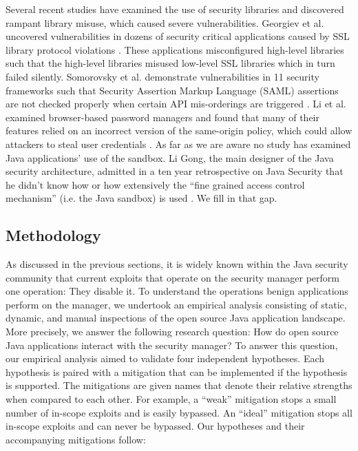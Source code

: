 \documentclass{sig-alternate}
\begin{document}
Several recent studies have examined the use of security libraries
and discovered rampant library misuse, which caused severe vulnerabilities.
Georgiev et al. uncovered vulnerabilities in dozens of security critical
applications caused by SSL library protocol violations \cite{georgiev12most-dangerous}.
These applications misconfigured high-level libraries such that the
high-level libraries misused low-level SSL libraries which in turn
failed silently. Somorovsky et al. demonstrate vulnerabilities in
11 security frameworks such that Security Assertion Markup Language
(SAML) assertions are not checked properly when certain API mis-orderings
are triggered \cite{somorovsky12breaking}. Li et al. examined browser-based
password managers and found that many of their features relied on
an incorrect version of the same-origin policy, which could allow
attackers to steal user credentials \cite{li2014emperor}. As far
as we are aware no study has examined Java applications' use of the
sandbox. Li Gong, the main designer of the Java security architecture,
admitted in a ten year retrospective on Java Security that he didn't
know how or how extensively the ``fine grained access control mechanism''
(i.e. the Java sandbox) is used \cite{gong2009java}. We fill in that
gap. 

\subsection{Methodology}

As discussed in the previous sections, it is widely known within the
Java security community that current exploits that operate on the
security manager perform one operation: They disable it. To understand
the operations benign applications perform on the manager, we undertook
an empirical analysis consisting of static, dynamic, and manual inspections
of the open source Java application landscape. More precisely, we
answer the following research question: How do open source Java applications
interact with the security manager? To answer this question, our empirical
analysis aimed to validate four independent hypotheses. Each hypothesis
is paired with a mitigation that can be implemented if the hypothesis
is supported. The mitigations are given names that denote their relative
strengths when compared to each other. For example, a ``weak'' mitigation
stops a small number of in-scope exploits and is easily bypassed.
An ``ideal'' mitigation stops all in-scope exploits and can never
be bypassed. Our hypotheses and their accompanying mitigations follow: 
\end{document}

